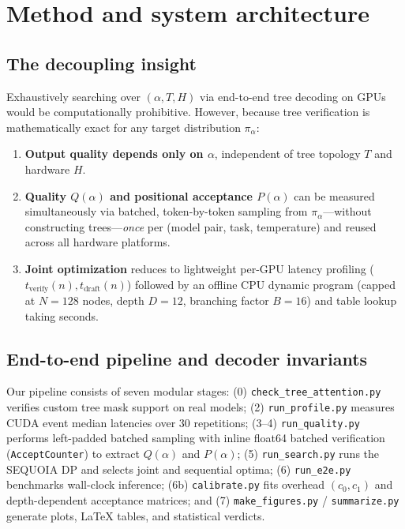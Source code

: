 \documentclass[10pt]{article}
\begin{document}
\section{Method and system architecture}

\subsection{The decoupling insight}
Exhaustively searching over $(\alpha, T, H)$ via end-to-end tree decoding on GPUs would be computationally prohibitive. However, because tree verification is mathematically exact for any target distribution $\pi_\alpha$:
\begin{enumerate}
    \item \textbf{Output quality depends only on $\alpha$}, independent of tree topology $T$ and hardware $H$.
    \item \textbf{Quality $Q(\alpha)$ and positional acceptance $P(\alpha)$} can be measured simultaneously via batched, token-by-token sampling from $\pi_\alpha$—without constructing trees—\emph{once} per (model pair, task, temperature) and reused across all hardware platforms.
    \item \textbf{Joint optimization} reduces to lightweight per-GPU latency profiling ($t_{\mathrm{verify}}(n), t_{\mathrm{draft}}(n)$) followed by an offline CPU dynamic program (capped at $N=128$ nodes, depth $D=12$, branching factor $B=16$) and table lookup taking seconds.
\end{enumerate}

\subsection{End-to-end pipeline and decoder invariants}
Our pipeline consists of seven modular stages: (0) \texttt{check\_tree\_attention.py} verifies custom tree mask support on real models; (2) \texttt{run\_profile.py} measures CUDA event median latencies over 30 repetitions; (3--4) \texttt{run\_quality.py} performs left-padded batched sampling with inline float64 batched verification (\texttt{AcceptCounter}) to extract $Q(\alpha)$ and $P(\alpha)$; (5) \texttt{run\_search.py} runs the SEQUOIA DP and selects joint and sequential optima; (6) \texttt{run\_e2e.py} benchmarks wall-clock inference; (6b) \texttt{calibrate.py} fits overhead $(c_0, c_1)$ and depth-dependent acceptance matrices; and (7) \texttt{make\_figures.py} / \texttt{summarize.py} generate plots, \LaTeX{} tables, and statistical verdicts.
\end{document}
